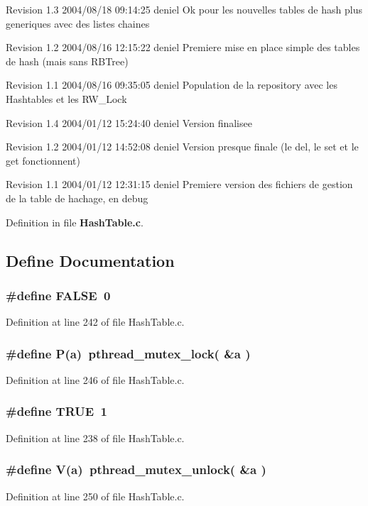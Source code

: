Revision 1.3 2004/08/18 09:14:25 deniel Ok pour les nouvelles tables de hash plus generiques avec des listes chaines

Revision 1.2 2004/08/16 12:15:22 deniel Premiere mise en place simple des tables de hash (mais sans RBTree)

Revision 1.1 2004/08/16 09:35:05 deniel Population de la repository avec les Hashtables et les RW\_\-Lock

Revision 1.4 2004/01/12 15:24:40 deniel Version finalisee

Revision 1.2 2004/01/12 14:52:08 deniel Version presque finale (le del, le set et le get fonctionnent)

Revision 1.1 2004/01/12 12:31:15 deniel Premiere version des fichiers de gestion de la table de hachage, en debug

Definition in file {\bf Hash\-Table.c}.

\subsection{Define Documentation}
\subsubsection{\setlength{\rightskip}{0pt plus 5cm}\#define FALSE\ 0}\label{HashTable_8c_a1}




Definition at line 242 of file Hash\-Table.c.
\subsubsection{\setlength{\rightskip}{0pt plus 5cm}\#define P(a)\ pthread\_\-mutex\_\-lock( \&a )}\label{HashTable_8c_a2}




Definition at line 246 of file Hash\-Table.c.
\subsubsection{\setlength{\rightskip}{0pt plus 5cm}\#define TRUE\ 1}\label{HashTable_8c_a0}




Definition at line 238 of file Hash\-Table.c.
\subsubsection{\setlength{\rightskip}{0pt plus 5cm}\#define V(a)\ pthread\_\-mutex\_\-unlock( \&a )}\label{HashTable_8c_a3}




Definition at line 250 of file Hash\-Table.c.
